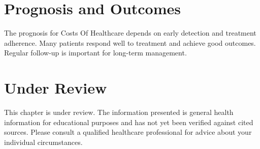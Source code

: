 \section*{Prognosis and Outcomes}
The prognosis for Costs Of Healthcare depends on early detection and treatment adherence. Many patients respond well to treatment and achieve good outcomes. Regular follow-up is important for long-term management.
\section*{Under Review}
This chapter is under review. The information presented is general health information for educational purposes and has not yet been verified against cited sources. Please consult a qualified healthcare professional for advice about your individual circumstances.


\clearpage

